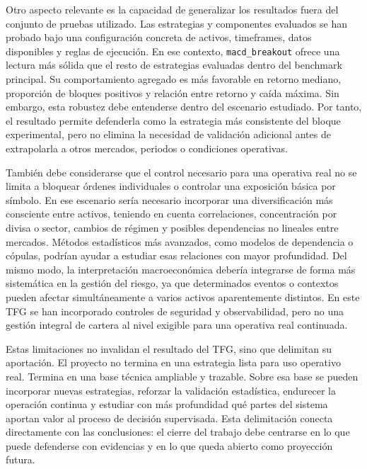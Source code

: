 Otro aspecto relevante es la capacidad de generalizar los resultados fuera del
conjunto de pruebas utilizado. Las estrategias y componentes evaluados se han
probado bajo una configuraci\'on concreta de activos, timeframes, datos
disponibles y reglas de ejecuci\'on. En ese contexto, \texttt{macd\_breakout}
ofrece una lectura m\'as s\'olida que el resto de estrategias evaluadas dentro del
benchmark principal. Su comportamiento agregado es m\'as favorable en retorno
mediano, proporci\'on de bloques positivos y relaci\'on entre retorno y ca\'ida
m\'axima. Sin embargo, esta robustez debe entenderse dentro del escenario
estudiado. Por tanto, el resultado permite defenderla como la estrategia m\'as
consistente del bloque experimental, pero no elimina la necesidad de validaci\'on
adicional antes de extrapolarla a otros mercados, periodos o condiciones
operativas.

Tambi\'en debe considerarse que el control necesario para una
operativa real no se limita a bloquear \'ordenes individuales o controlar una
exposici\'on b\'asica por s\'imbolo. En ese escenario ser\'ia necesario
incorporar una diversificaci\'on m\'as consciente entre activos, teniendo en
cuenta correlaciones, concentraci\'on por divisa o sector, cambios de r\'egimen y
posibles dependencias no lineales entre mercados. M\'etodos estad\'isticos m\'as
avanzados, como modelos de dependencia o c\'opulas, podr\'ian ayudar a estudiar
esas relaciones con mayor profundidad. Del mismo modo, la interpretaci\'on
macroecon\'omica deber\'ia integrarse de forma m\'as sistem\'atica en la gesti\'on
del riesgo, ya que determinados eventos o contextos pueden afectar
simult\'aneamente a varios activos aparentemente distintos. En este TFG se han
incorporado controles de seguridad y observabilidad, pero no una gesti\'on
integral de cartera al nivel exigible para una operativa real continuada.

Estas limitaciones no invalidan el resultado del TFG, sino que delimitan su
aportaci\'on. El proyecto no termina en una estrategia lista para uso operativo
real. Termina en una base t\'ecnica ampliable y trazable. Sobre esa base se pueden
incorporar nuevas estrategias, reforzar la validaci\'on estad\'istica, endurecer
la operaci\'on continua y estudiar con m\'as profundidad qu\'e partes del sistema
aportan valor al proceso de decisi\'on supervisada. Esta delimitaci\'on conecta
directamente con las conclusiones: el cierre del trabajo debe centrarse en lo
que puede defenderse con evidencias y en lo que queda abierto como
proyecci\'on futura.

\flushbottom
